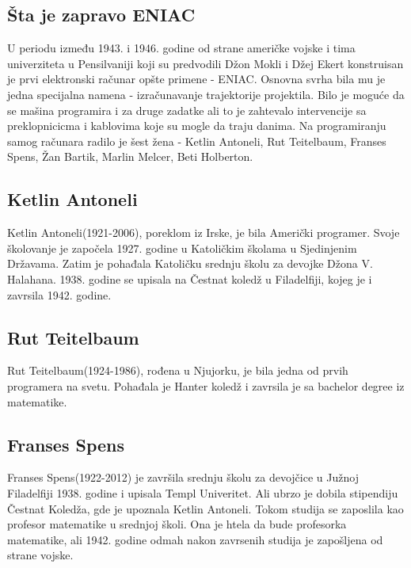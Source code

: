 \documentclass[a4paper,12pt]{article}
\begin{document}
\subsection{Šta je zapravo ENIAC}
\begin{flushleft}

U periodu između 1943. i 1946. godine od strane američke vojske i tima univerziteta u Pensilvaniji koji su predvodili Džon Mokli i Džej Ekert konstruisan je prvi elektronski računar opšte primene - ENIAC. Osnovna svrha bila mu je jedna specijalna namena - izračunavanje trajektorije projektila. Bilo je moguće da se mašina programira i za druge zadatke ali to je zahtevalo intervencije sa preklopnicicma i kablovima koje su mogle da traju danima. Na programiranju samog računara radilo je šest žena - Ketlin Antoneli, Rut Teitelbaum, Franses Spens, Žan Bartik, Marlin Melcer, Beti Holberton.

\end{flushleft}

\subsection{Ketlin Antoneli}
\begin{flushleft}

Ketlin Antoneli(1921-2006), poreklom iz Irske, je bila Američki programer. Svoje školovanje je započela 1927. godine u Katoličkim školama u Sjedinjenim Državama. Zatim je pohađala Katoličku srednju školu za devojke Džona V. Halahana. 1938. godine se upisala na Čestnat koledž u Filadelfiji, kojeg je i zavrsila 1942. godine.

\end{flushleft}

\subsection{Rut Teitelbaum}
\begin{flushleft}

Rut Teitelbaum(1924-1986), rođena u Njujorku, je bila jedna od prvih programera na svetu. Pohađala je Hanter koledž i zavrsila je sa bachelor degree iz matematike.

\end{flushleft}

\subsection{Franses Spens}
\begin{flushleft}

Franses Spens(1922-2012) je završila srednju školu za devojčice u Južnoj Filadelfiji 1938. godine i upisala Templ Univeritet. Ali ubrzo je dobila stipendiju Čestnat Koledža, gde je upoznala Ketlin Antoneli. Tokom studija se zaposlila kao profesor matematike u srednjoj školi. Ona je htela da bude profesorka matematike, ali 1942. godine odmah nakon zavrsenih studija je zapošljena od strane vojske.

\end{flushleft}
\end{document}
